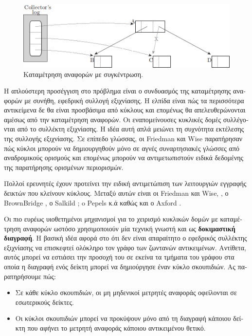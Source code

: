 \begin{greek}
\begin{figure}[H]
  \centering
  \includegraphics{figures/refcnt_1}
  \caption{Καταμέτρηση αναφορών με συγκέντρωση.}
  \label{fig:refcnt_1}  
\end{figure}

Η απλούστερη προσέγγιση στο πρόβλημα είναι ο συνδυασμός της
καταμέτρησης αναφορών με συνήθη, εφεδρική συλλογή εξιχνίασης.
Η ελπίδα είναι πώς τα περισσότερα αντικείμενα δε θα είναι 
προσβάσιμα από κύκλους και επομένως θα απελευθερώνονται
αμέσως από την καταμέτρηση αναφορών. Οι εναπομείνουσες
κυκλικές δομές συλλέγονται από το συλλέκτη εξιχνίασης. Η
ιδέα αυτή απλά μειώνει τη συχνότητα εκτέλεσης της συλλογής
εξιχνίασης. Σε επίπεδο γλώσσας, οι Friedman και Wise
\cite{DBLP:journals/ipl/FriedmanW79} παρατήρησαν πώς κύκλοι
μπορούν να δημιουργηθούν μόνο σε αγνές συναρτησιακές γλώσσες
από αναδρομικούς ορισμούς και επομένως μπορούν να
αντιμετωπιστούν ειδικά δεδομένης της παρατήρησης ορισμένων
περιορισμών.

Πολλοί ερευνητές έχουν προτείνει την ειδική αντιμετώπιση
των λειτουργιών εγγραφής δεικτών που κλείνουν κύκλους.
Μεταξύ αυτών είναι οι Friedman και Wise,
\cite{DBLP:journals/ipl/FriedmanW79}, ο BrownBridge
\cite{DBLP:conf/fpca/Brownbridge85}, ο Salkild
\cite{salkild1987implementation}; o Pepels κ.ά
\cite{pepels1988cyclic} καθώς και ο Axford
\cite{DBLP:journals/cj/Axford90}.

Οι πιο ευρέως υιοθετημένοι μηχανισμοί για το χειρισμό
κυκλικών δομών με καταμέτρηση αναφορών ωστόσο χρησιμοποιούν
μία τεχνική γνωστή και ως \textbf{δοκιμαστική διαγραφή}.
Η βασική ιδέα αφορά στο ότι δεν είναι απαραίτητο ο εφεδρικός
συλλέκτης εξιχνίασης να επισκεφτεί ολόκληρο τον γράφο των
ζωντανών αντικειμένων. Αντίθετα, αυτός μπορεί να εστιάσει
την προσοχή του σε εκείνα τα τμήματα του γράφου στα οποία
η διαγραφή ενός δείκτη μπορεί να δημιούργησε έναν κύκλο
σκουπιδιών. Ας παρατηρήσουμε πώς:

\begin{itemize}
  \item Σε κάθε κύκλο σκουπιδιών, οι μη μηδενικοί μετρητές
    αναφοράς οφείλονται σε εσωτερικούς δείκτες.
  \item Οι κύκλοι σκουπιδιών μπορεί να προκύψουν μόνο από τη
    διαγραφή κάποιου δείκτη που αφήνει το μετρητή αναφοράς
    κάποιου αντικειμένου θετικό.
\end{itemize} 


\end{greek}
